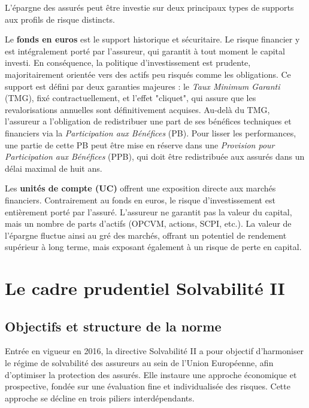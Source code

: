 L'épargne des assurés peut être investie sur deux principaux types de supports aux profils de risque distincts.

\bigskip

Le \textbf{fonds en euros} est le support historique et sécuritaire. Le risque financier y est intégralement porté par l'assureur, qui garantit à tout moment le capital investi. En conséquence, la politique d'investissement est prudente, majoritairement orientée vers des actifs peu risqués comme les obligations. Ce support est défini par deux garanties majeures : le \textit{Taux Minimum Garanti} (TMG), fixé contractuellement, et l'effet "cliquet", qui assure que les revalorisations annuelles sont définitivement acquises. Au-delà du TMG, l'assureur a l'obligation de redistribuer une part de ses bénéfices techniques et financiers via la \textit{Participation aux Bénéfices} (PB). Pour lisser les performances, une partie de cette PB peut être mise en réserve dans une \textit{Provision pour Participation aux Bénéfices} (PPB), qui doit être redistribuée aux assurés dans un délai maximal de huit ans.

\bigskip

Les \textbf{unités de compte (UC)} offrent une exposition directe aux marchés financiers. Contrairement au fonds en euros, le risque d'investissement est entièrement porté par l'assuré. L'assureur ne garantit pas la valeur du capital, mais un nombre de parts d'actifs (OPCVM, actions, SCPI, etc.). La valeur de l'épargne fluctue ainsi au gré des marchés, offrant un potentiel de rendement supérieur à long terme, mais exposant également à un risque de perte en capital.

\section{Le cadre prudentiel Solvabilité II}
\label{sec:s2}

\subsection{Objectifs et structure de la norme}

Entrée en vigueur en 2016, la directive Solvabilité II a pour objectif d'harmoniser le régime de solvabilité des assureurs au sein de l'Union Européenne, afin d'optimiser la protection des assurés. Elle instaure une approche économique et prospective, fondée sur une évaluation fine et individualisée des risques. Cette approche se décline en trois piliers interdépendants.

